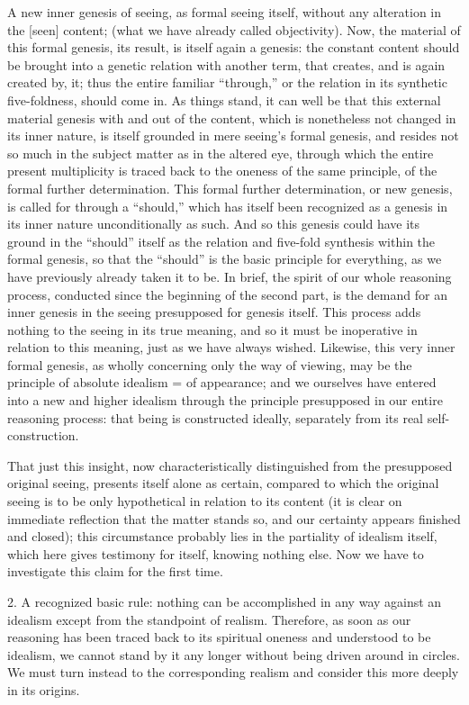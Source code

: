 A new inner genesis of seeing,
as formal seeing itself,
without any alteration in the [seen] content;
(what we have already called objectivity).
Now, the material of this formal genesis,
its result, is itself again a genesis:
the constant content should be brought
into a genetic relation with another term,
that creates, and is again created by, it;
thus the entire familiar “through,”
or the relation in its synthetic five-foldness,
should come in.
As things stand, it can well be that
this external material genesis
with and out of the content,
which is nonetheless not changed in its inner nature,
is itself grounded in mere seeing's formal genesis,
and resides not so much in the subject matter as in the altered eye,
through which the entire present multiplicity is traced
back to the oneness of the same principle,
of the formal further determination.
This formal further determination,
or new genesis, is called for through a “should,”
which has itself been recognized as a genesis
in its inner nature unconditionally as such.
And so this genesis could have its ground
in the “should” itself as the relation and
five-fold synthesis within the formal genesis,
so that the “should” is the basic principle for everything,
as we have previously already taken it to be.
In brief, the spirit of our whole reasoning process,
conducted since the beginning of the second part,
is the demand for an inner genesis
in the seeing presupposed for genesis itself.
This process adds nothing to the seeing in its true meaning,
and so it must be inoperative in relation to this meaning,
just as we have always wished.
Likewise, this very inner formal genesis,
as wholly concerning only the way of viewing,
may be the principle of absolute idealism = of appearance;
and we ourselves have entered into a new and higher idealism
through the principle presupposed in
our entire reasoning process:
that being is constructed ideally,
separately from its real self-construction.

That just this insight,
now characteristically distinguished
from the presupposed original seeing,
presents itself alone as certain,
compared to which the original seeing is
to be only hypothetical in relation to its content
(it is clear on immediate reflection that the matter stands so,
and our certainty appears finished and closed);
this circumstance probably lies in the partiality of idealism itself,
which here gives testimony for itself, knowing nothing else.
Now we have to investigate this claim for the first time.

2. A recognized basic rule:
nothing can be accomplished in any way against an idealism
except from the standpoint of realism.
Therefore, as soon as our reasoning
has been traced back to its spiritual oneness
and understood to be idealism,
we cannot stand by it any longer
without being driven around in circles.
We must turn instead to the corresponding realism
and consider this more deeply in its origins.

